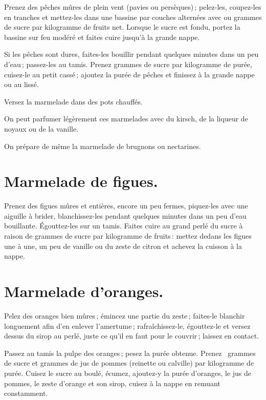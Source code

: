 Prenez des pêches mûres de plein vent (pavies ou persèques) ; pelez-les,
coupez-les en tranches et mettez-les dans une bassine par couches alternées
avec {\mmm} ou {\mmm} grammes de sucre par kilogramme de fruits
net. Lorsque le sucre est fondu, portez la bassine sur feu modéré et faites
cuire jusqu'à la grande nappe.

\sk

Si les pêches sont dures, faites-les bouillir pendant quelques minutes dans un
peu d'eau ; passez-les au tamis. Prenez {\mmm} grammes de sucre par
kilogramme de purée, cuisez-le au petit cassé ; ajoutez la purée de pêches et
finissez à la grande nappe ou au lissé.

Versez la marmelade dans des pots chauffés.

\medskip

On peut parfumer légèrement ces marmelades avec du kirsch, de la liqueur de
noyaux ou de la vanille.

\sk

On prépare de même la marmelade de brugnons ou nectarines.

\section*{\centering Marmelade de figues.}
{}

Prenez des figues mûres et entières, encore un peu fermes, piquez-les avec une
aiguille à brider, blanchissez-les pendant quelques minutes dans un peu d'eau
bouillante. Égouttez-les sur un tamis. Faites cuire au grand perlé du sucre
à raison de {\mmm} grammes de sucre par kilogramme de fruits : mettez
dedans les figues une à une, un peu de vanille ou du zeste de citron et achevez
la cuisson à la nappe.

\section*{\centering Marmelade d’oranges.}
{}

Pelez des oranges bien mûres ; émincez une partie du zeste ; faites-le blanchir
longuement afin d'en enlever l'amertume ; rafraîchissez-le, égouttez-le et
versez dessus du sirop au perlé, juste ce qu'il en faut pour le couvrir ;
laissez en contact.

Passez au tamis la pulpe des oranges ; pesez la purée obtenue. Prenez
{\mmm} {\mmm} grammes de sucre et {\mmm} grammes de jus de
pommes (reinette ou calville) par kilogramme de purée. Cuisez le sucre au
boulé, écumez, ajoutez-y la purée d'oranges, le jus de pommes, le zeste
d'orange et son sirop, cuisez à la nappe en remuant constamment.

